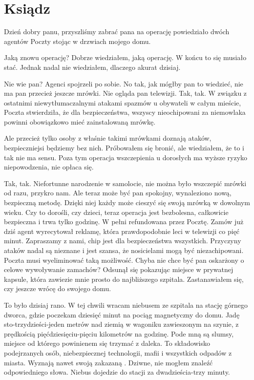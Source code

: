 \chapter{Ksiądz} 
\ds{} Dzień dobry panu, przyszliśmy zabrać pana na operację \dm{} powiedziało dwóch agentów Poczty stojąc w drzwiach mojego domu. \de{}

\ds{} Jaką znowu operację? \dm{} Dobrze wiedziałem, jaką operację. W końcu to się musiało stać. Jednak nadal nie wiedziałem, dlaczego akurat dzisiaj. \de{}

\ds{} Nie wie pan? \dm{} Agenci spojrzeli po sobie. \dm{} No tak, jak mógłby pan to wiedzieć, nie ma pan przecież jeszcze mrówki. Nie ogląda pan telewizji.
Tak, tak.
W związku z ostatnimi niewytłumaczalnymi atakami spazmów u obywateli w całym mieście, Poczta stwierdziła, że dla bezpieczeństwa, 
wszyscy nieochipowani za niemowlaka powinni obowiązkowo mieć zainstalowaną mrówkę. \de{}

\ds{} Ale przecież tylko osoby z właśnie takimi mrówkami doznają ataków, bezpieczniejsi będziemy bez nich. \dm{} Próbowałem się bronić, ale wiedziałem, że
to i tak nie ma sensu. \dm{} Poza tym operacja wszczepienia u dorosłych ma wyższe ryzyko niepowodzenia, nie opłaca się. \de{}

\ds{} Tak, tak. Niefortunne narodzenie w samolocie, nie można było wszczepić mrówki od razu, przykro nam.
Ale teraz może być pan spokojny, wynaleziono nową, bezpieczną metodę. Dzięki niej każdy może cieszyć się swoją mrówką w dowolnym wieku.
Czy to dorośli, czy dzieci, teraz operacja jest bezbolesna, całkowicie bezpieczna i trwa tylko godzinę.
W pełni refundowana przez Pocztę. Zamów już dziś \dm{} agent wyrecytował reklamę, która prawdopodobnie leci w telewizji co pięć minut. \dm{}
Zapraszamy z nami, chip jest dla bezpieczeństwa wszystkich. Przyczyny ataków nadal są nieznane i jest szansa, że nosicielami mogą być niezachipowani.
Poczta musi wyeliminować taką możliwość.
Chyba nie chce być pan oskarżony o celowe wywoływanie zamachów? \dm{} Odsunął się pokazując miejsce w prywatnej kapsule, która zawiezie mnie prosto do 
najbliższego szpitala. Zastanawiałem się, czy jeszcze wrócę do swojego domu.

To było dzisiaj rano. W tej chwili wracam niebusem ze szpitala na stację górnego dworca, gdzie poczekam dziesięć minut na pociąg magnetyczny do domu.
Jadę sto-trzydzieści-jeden metrów nad ziemią w wagoniku zawieszonym na szynie, z prędkością pięćdziesięciu-pięciu kilometrów na godzinę. 
Pode mną są slumsy, miejsce od którego powinienem się trzymać z daleka. 
To składowisko podejrzanych osób, niebezpiecznej technologii, mafii i wszystkich odpadów z miasta.
Wyznają nawet swoją zakazaną \censor{}.
Dziwne, nie mogłem znaleźć odpowiedniego słowa.
Niebus dojedzie do stacji za dwadzieścia-trzy minuty.

